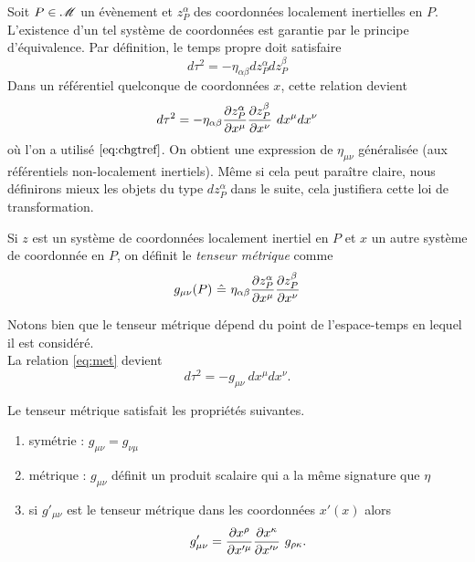\documentclass[a4paper,11pt]{report}
\begin{document}
            Soit $P\in\mathscr{M}$ un évènement et $z^\alpha_P$ des coordonnées localement inertielles en $P$. L'existence d'un tel système de coordonnées est garantie par le principe d'équivalence. Par définition, le temps propre doit satisfaire
            \begin{equation}
                d\tau^2 = -\eta_{\alpha\beta}dz^\alpha_Pdz^\beta_P
            \end{equation}
            Dans un référentiel quelconque de coordonnées $x$, cette relation devient
            \begin{equation}\label{eq:met}
                d\tau^2 = -\eta_{\alpha\beta}\frac{\partial z^\alpha_P}{\partial x^\mu}\frac{\partial z^\beta_P}{\partial x^\nu}~dx^\mu dx^\nu
            \end{equation}
            où l'on a utilisé $\ref{eq:chgtref}$. On obtient une expression de $\eta_{\mu\nu}$ généralisée (aux référentiels non-localement inertiels). Même si cela peut paraître claire, nous définirons mieux les objets du type $dz^\alpha_P$ dans le suite, cela justifiera cette loi de transformation.
            
            \begin{defn}
                Si $z$ est un système de coordonnées localement inertiel en $P$ et $x$ un autre système de coordonnée en $P$, on définit le \textit{tenseur métrique} comme
                \begin{equation}
                    g_{\mu\nu}(P)~\hat{=}~\eta_{\alpha\beta}\frac{\partial z^\alpha_P}{ \partial x^\mu}\frac{\partial z^\beta_P}{\partial x^\nu}
                \end{equation}
            \end{defn}
            Notons bien que le tenseur métrique dépend du point de l'espace-temps en lequel il est considéré.\\
            La relation \ref{eq:met} devient
            \begin{equation}
                d\tau^2 = -g_{\mu\nu}~dx^\mu dx^\nu.
            \end{equation}
            
            \begin{prop}\begin{leftbar}
                Le tenseur métrique satisfait les propriétés suivantes.
                \begin{enumerate}[label = \textit{\roman*)}]
                    \item symétrie : $g_{\mu\nu}=g_{\nu\mu}$
                    \item métrique : $g_{\mu\nu}$ définit un produit scalaire qui a la même signature que $\eta$
                    \item si $g'_{\mu\nu}$ est le tenseur métrique dans les coordonnées $x'(x)$ alors
                    \begin{equation}
                        g'_{\mu\nu} = \frac{\partial x^\rho}{\partial x'^\mu}\frac{\partial x^\kappa}{\partial x'^\nu}~g_{\rho\kappa}.
                    \end{equation}
                \end{enumerate}
            \end{leftbar}\end{prop}
            
\end{document}
